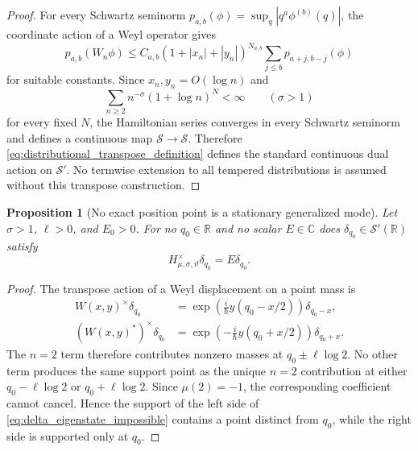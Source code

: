 \documentclass[11pt]{amsart}
\numberwithin{equation}{section}
\theoremstyle{plain}
\newtheorem{proposition}[theorem]{Proposition}
\theoremstyle{definition}
\theoremstyle{remark}
\newcommand{\R}{\mathbb{R}}
\newcommand{\C}{\mathbb{C}}
\newcommand{\Sch}{\mathcal{S}}
\begin{document}
\begin{proof}
For every Schwartz seminorm
\(p_{a,b}(\phi)=\sup_q|q^a\phi^{(b)}(q)|\), the coordinate action of a
Weyl operator gives
\begin{equation}
p_{a,b}(W_n\phi)
\le
C_{a,b}(1+|x_n|+|y_n|)^{N_{a,b}}
\sum_{j\le b}p_{a+j,b-j}(\phi)
\label{eq:weyl_schwartz_bound}
\end{equation}
for suitable constants.  Since \(x_n,y_n=O(\log n)\) and
\begin{equation}
\sum_{n\ge2}n^{-\sigma}(1+\log n)^N<\infty
\qquad(\sigma>1)
\label{eq:log_weight_summability}
\end{equation}
for every fixed \(N\), the Hamiltonian series converges in every Schwartz
seminorm and defines a continuous map \(\Sch\to\Sch\).  Therefore
\eqref{eq:distributional_transpose_definition} defines the standard
continuous dual action on \(\Sch'\).  No termwise extension to all tempered
distributions is assumed without this transpose construction.
\end{proof}

\begin{proposition}[No exact position point is a stationary generalized mode]
\label{prop:no_delta_eigenstate}
Let \(\sigma>1\), \(\ell>0\), and \(E_0>0\).  For no
\(q_0\in\R\) and no scalar \(E\in\C\) does
\(\delta_{q_0}\in\Sch'(\R)\) satisfy
\begin{equation}
H^{\times}_{\mu,\sigma,\vartheta}\delta_{q_0}
=E\delta_{q_0}.
\label{eq:delta_eigenstate_impossible}
\end{equation}
\end{proposition}

\begin{proof}
The transpose action of a Weyl displacement on a point mass is
\begin{align}
W(x,y)^{\times}\delta_{q_0}
&=
\exp\left(\frac{i}{\hbar}y(q_0-x/2)\right)
\delta_{q_0-x},
\label{eq:W_delta_action}\\
(W(x,y)^*)^{\times}\delta_{q_0}
&=
\exp\left(-\frac{i}{\hbar}y(q_0+x/2)\right)
\delta_{q_0+x}.
\label{eq:Wstar_delta_action}
\end{align}
The \(n=2\) term therefore contributes nonzero masses at
\(q_0\pm\ell\log2\).  No other term produces the same support point as the unique \(n=2\) contribution at either \(q_0-\ell\log2\) or \(q_0+\ell\log2\).
Since \(\mu(2)=-1\), the corresponding coefficient cannot cancel.  Hence
the support of the left side of \eqref{eq:delta_eigenstate_impossible}
contains a point distinct from \(q_0\), while the right side is supported
only at \(q_0\).
\end{proof}
\end{document}
